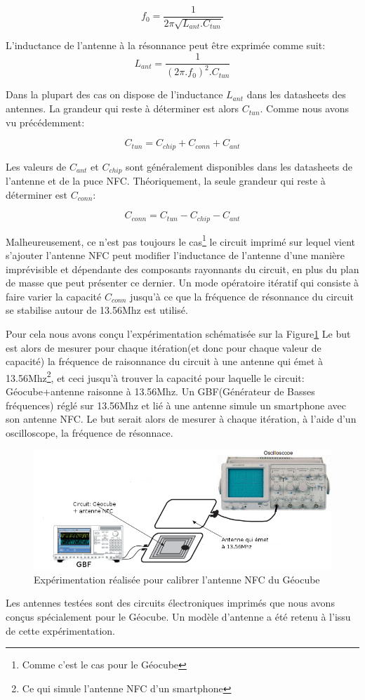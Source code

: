 \documentclass{themeensg}
\begin{document}
$$f_0=\frac{1}{2\pi\sqrt{L_{ant}.C_{tun}}}$$

L'inductance de l'antenne à la résonnance peut être exprimée comme suit:
$$L_{ant}=\frac{1}{(2\pi.f_0)^2.C_{tun}}$$

Dans la plupart des cas on dispose de l'inductance $L_{ant}$ dans les datasheets des antennes. La grandeur qui reste à déterminer est alors $C_{tun}$. Comme nous avons vu précédemment:

$$C_{tun}=C_{chip}+C_{conn}+C_{ant}$$

Les valeurs de $C_{ant}$ et $C_{chip}$ sont généralement disponibles dans les datasheets de l'antenne et de la puce NFC. Théoriquement, la seule grandeur qui reste à déterminer est $C_{conn}$:

$$C_{conn}=C_{tun}-C_{chip}-C_{ant}$$

Malheureusement, ce n'est pas toujours le cas\footnote{Comme c'est le cas pour le Géocube} le circuit imprimé sur lequel vient s'ajouter l'antenne NFC peut modifier l'inductance de l'antenne d'une manière imprévisible et dépendante des composants rayonnants du circuit, en plus du plan de masse que peut présenter ce dernier. Un mode opératoire itératif qui consiste à faire varier la capacité $C_{conn}$ jusqu'à ce que la fréquence de résonnance du circuit se stabilise autour de 13.56Mhz est utilisé.

Pour cela nous avons conçu l'expérimentation schématisée sur la Figure\ref{experience} Le but est alors de mesurer pour chaque itération(et donc pour chaque valeur de capacité) la fréquence de raisonnance du circuit à une antenne qui émet à 13.56Mhz\footnote{Ce qui simule l'antenne NFC d'un smartphone}, et ceci jusqu'à trouver la capacité pour laquelle le circuit: Géocube+antenne raisonne à 13.56Mhz. Un GBF(Générateur de Basses fréquences) réglé sur 13.56Mhz et lié à une antenne simule un smartphone avec son antenne NFC. Le but serait alors de mesurer à chaque itération, à l'aide d'un oscilloscope, la fréquence de résonnace.

\begin{figure}[h!]
\centering
\label{experience}
\includegraphics[scale=0.55]{images/gbfoscillo.png}
\caption{Expérimentation réalisée pour calibrer l'antenne NFC du Géocube}
\end{figure}
Les antennes testées sont des circuits électroniques imprimés que nous avons conçus spécialement pour le Géocube. Un modèle d'antenne a été retenu à l'issu de cette expérimentation.
\end{document}
